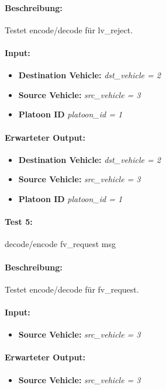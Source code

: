 \documentclass[a4paper, 12pt, titlepage]{scrartcl}
\begin{document}
{			\paragraph{Beschreibung:} Testet encode/decode für lv\_reject.
			\paragraph{Input:}
			\begin{itemize} \itemsep-0.5em
				\item \textbf{Destination Vehicle:} \emph{dst\_vehicle = 2}
				\item \textbf{Source Vehicle:} \emph{src\_vehicle = 3}
				\item \textbf{Platoon ID} \emph{platoon\_id = 1}
			\end{itemize}
			\paragraph{Erwarteter Output:}
			\begin{itemize} \itemsep-0.5em
				\item \textbf{Destination Vehicle:} \emph{dst\_vehicle = 2}
				\item \textbf{Source Vehicle:} \emph{src\_vehicle = 3}
				\item \textbf{Platoon ID} \emph{platoon\_id = 1}
			\end{itemize}


			\paragraph{Test 5:}{decode/encode fv\_request msg}
			\paragraph{Beschreibung:} Testet encode/decode für fv\_request.
			\paragraph{Input:}
			\begin{itemize} \itemsep-0.5em
				\item \textbf{Source Vehicle:} \emph{src\_vehicle = 3}
			\end{itemize}
			\paragraph{Erwarteter Output:}
			\begin{itemize} \itemsep-0.5em
				\item \textbf{Source Vehicle:} \emph{src\_vehicle = 3}
			\end{itemize}

}
\end{document}
